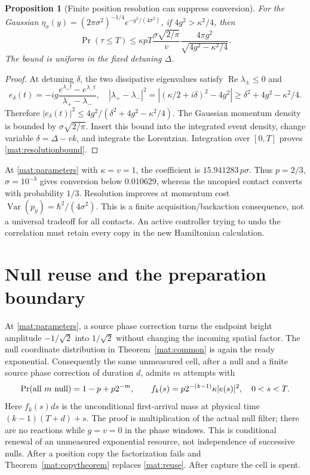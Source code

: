 \documentclass[11pt,oneside,openany]{book}
\newtheorem{proposition}[theorem]{Proposition}
\theoremstyle{definition}
\theoremstyle{remark}\newtheorem{remark}[theorem]{Remark}
\begin{document}
\begin{proposition}[Finite position resolution can suppress conversion]
\label{mat:copybound}
For the Gaussian $\eta_\sigma(y)=(2\pi\sigma^2)^{-1/4}e^{-y^2/(4\sigma^2)}$, if $4g^2>\kappa^2/4$, then
\begin{equation}
 \Pr(\tau\le T)\le
 \kappa pT\frac{\sigma\sqrt{2/\pi}}v
 \frac{4\pi g^2}{\sqrt{4g^2-\kappa^2/4}}.
 \label{mat:resolutionbound}
\end{equation}
The bound is uniform in the fixed detuning $\Delta$.
\end{proposition}
\begin{proof}
At detuning $\delta$, the two dissipative eigenvalues satisfy $\operatorname{Re}\lambda_\pm\le0$ and
\[
 e_\delta(t)=-ig\frac{e^{\lambda_+t}-e^{\lambda_-t}}{\lambda_+-\lambda_-},
 \quad |\lambda_+-\lambda_-|^2
 =|(\kappa/2+i\delta)^2-4g^2|
 \ge\delta^2+4g^2-\kappa^2/4.
\]
Therefore $|e_\delta(t)|^2\le4g^2/(\delta^2+4g^2-\kappa^2/4)$. The Gaussian momentum density is bounded by $\sigma\sqrt{2/\pi}$. Insert this bound into the integrated event density, change variable $\delta=\Delta-vk$, and integrate the Lorentzian. Integration over $[0,T]$ proves \eqref{mat:resolutionbound}.
\end{proof}

At \eqref{mat:parameters} with $\kappa=v=1$, the coefficient is $15.941283\,p\sigma$. Thus $p=2/3$, $\sigma=10^{-3}$ gives conversion below $0.010629$, whereas the uncopied contact converts with probability $1/3$. Resolution improves at momentum cost $\operatorname{Var}(p_y)=\hbar^2/(4\sigma^2)$. This is a finite acquisition/backaction consequence, not a universal tradeoff for all contacts. An active controller trying to undo the correlation must retain every copy in the new Hamiltonian calculation.

\section{Null reuse and the preparation boundary}

At \eqref{mat:parameters}, a source phase correction turns the endpoint bright amplitude $-1/\sqrt2$ into $1/\sqrt2$ without changing the incoming spatial factor. The null coordinate distribution in Theorem~\ref{mat:common} is again the ready exponential. Consequently the same unmeasured cell, after a null and a finite source phase correction of duration $d$, admits $m$ attempts with
\begin{equation}
 \Pr(\hbox{all }m\hbox{ null})=1-p+p2^{-m},\qquad
 f_k(s)=p2^{-(k-1)}\kappa|e(s)|^2,\quad 0<s<T.
 \label{mat:reuse}
\end{equation}
Here $f_k(s)ds$ is the unconditional first-arrival mass at physical time $(k-1)(T+d)+s$. The proof is multiplication of the actual null filter; there are no reactions while $g=v=0$ in the phase windows. This is conditional renewal of an unmeasured exponential resource, not independence of successive nulls. After a position copy the factorization fails and Theorem~\ref{mat:copytheorem} replaces \eqref{mat:reuse}. After capture the cell is spent.
\end{document}
